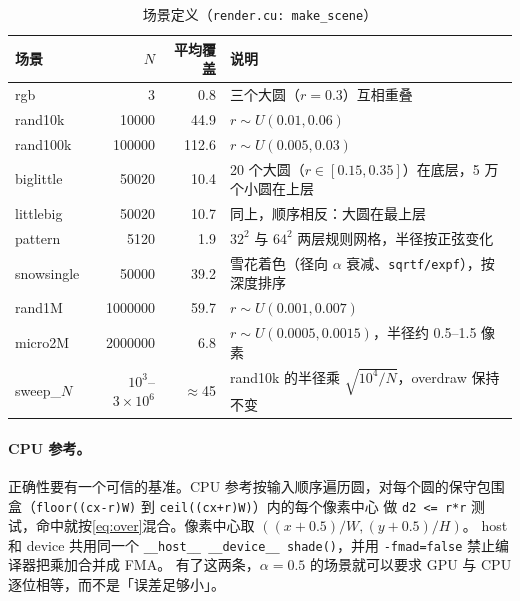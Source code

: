 \documentclass[11pt,a4paper]{ctexart}
\begin{document}
\begin{table}[H]
\centering\small
\caption{场景定义（\texttt{render.cu: make\_scene}）}\label{tab:scenes}
\begin{tabular}{lrrl}
\toprule
场景 & $N$ & 平均覆盖 & 说明 \\
\midrule
rgb & 3 & 0.8 & 三个大圆（$r=0.3$）互相重叠 \\
rand10k & 10000 & 44.9 & $r\sim U(0.01,0.06)$ \\
rand100k & 100000 & 112.6 & $r\sim U(0.005,0.03)$ \\
biglittle & 50020 & 10.4 & 20 个大圆（$r\in[0.15,0.35]$）在底层，5 万个小圆在上层 \\
littlebig & 50020 & 10.7 & 同上，顺序相反：大圆在最上层 \\
pattern & 5120 & 1.9 & $32^2$ 与 $64^2$ 两层规则网格，半径按正弦变化 \\
snowsingle & 50000 & 39.2 & 雪花着色（径向 $\alpha$ 衰减、\texttt{sqrtf/expf}），按深度排序 \\
rand1M & 1000000 & 59.7 & $r\sim U(0.001,0.007)$ \\
micro2M & 2000000 & 6.8 & $r\sim U(0.0005,0.0015)$，半径约 0.5--1.5 像素 \\
sweep\_$N$ & $10^3$--$3\times10^6$ & $\approx$45 & rand10k 的半径乘 $\sqrt{10^4/N}$，overdraw 保持不变 \\
\bottomrule
\end{tabular}
\end{table}

\paragraph{CPU 参考。} 正确性要有一个可信的基准。CPU 参考按输入顺序遍历圆，对每个圆的保守包围盒（\texttt{floor((cx-r)W)} 到 \texttt{ceil((cx+r)W)}）内的每个像素中心
做 \texttt{d2 <= r*r} 测试，命中就按\cref{eq:over}混合。像素中心取 $((x+0.5)/W,(y+0.5)/H)$。
host 和 device 共用同一个 \texttt{\_\_host\_\_ \_\_device\_\_ shade()}，并用 \texttt{-fmad=false} 禁止编译器把乘加合并成 FMA。
有了这两条，$\alpha=0.5$ 的场景就可以要求 GPU 与 CPU 逐位相等，而不是「误差足够小」。
\end{document}
